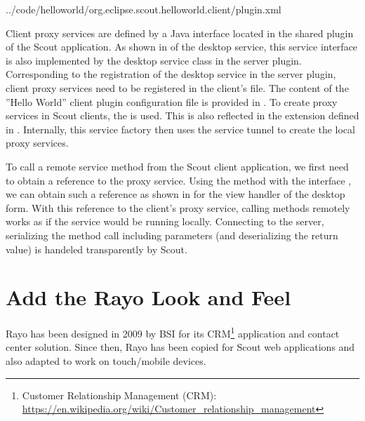 \documentclass[a4paper,10pt,twoside]{book}
\begin{document}

{../code/helloworld/org.eclipse.scout.helloworld.client/plugin.xml}

Client proxy services are defined by a Java interface located in the shared plugin of the Scout application.
As shown in  of the desktop service, this service interface is also implemented by the desktop service class in the server plugin.
Corresponding to the registration of the desktop service in the server plugin, client proxy services need to be registered in the client's  file.
The content of the ''Hello World'' client plugin configuration file is provided in .
To create proxy services in Scout clients, the  is used. 
This is also reflected in the extension defined in .
Internally, this service factory then uses the service tunnel to create the local proxy services.

To call a remote service method from the Scout client application, we first need to obtain a reference to the proxy service.
Using the  method with the interface , we can obtain such a reference as shown in  for the view handler of the desktop form.
With this reference to the client's proxy service, calling methods remotely works as if the service would be running locally.
Connecting to the server, serializing the method call including parameters (and deserializing the return value) is handeled transparently by Scout.

\section{Add the Rayo Look and Feel}

Rayo has been designed in 2009 by BSI for its CRM\footnote{
Customer Relationship Management (CRM): \url{https://en.wikipedia.org/wiki/Customer_relationship_management}} 
application and contact center solution.
Since then, Rayo has been copied for Scout web applications and also adapted to work on touch/mobile devices.
\end{document}
